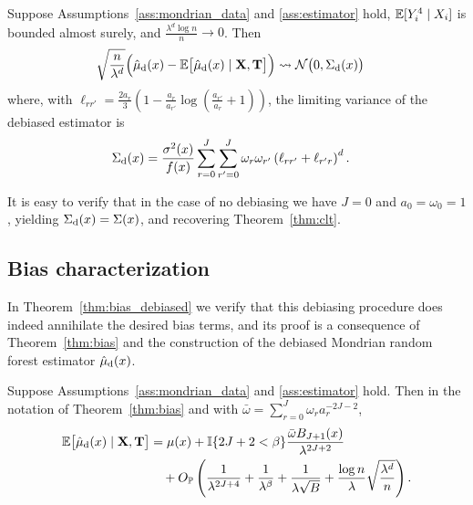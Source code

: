 \begin{theorem}%
  \label{thm:clt_debiased}
  Suppose Assumptions~\ref{ass:mondrian_data} and \ref{ass:estimator} hold,
  $\mathbb{E}[Y_i^4 \mid X_i ]$ is bounded almost surely,
  and $\frac{\lambda^d \log n}{n} \to 0$. Then
  \begin{align*}
    \sqrt{\frac{n}{\lambda^d}}
    \Big(
      \hat \mu_{\mathrm{d}}(x)
      - \mathbb{E} \big[ \hat \mu_{\mathrm{d}}(x) \mid \mathbf{X}, \mathbf{T} \big]
    \Big)
    &\rightsquigarrow
    \mathcal{N}\big(0, \Sigma_{\mathrm{d}}(x)\big)
  \end{align*}
  where, with
  $\ell_{r r'} = \frac{2 a_r}{3} \left( 1 - \frac{a_{r}}{a_{r'}}
  \log\left(\frac{a_{r'}}{a_{r}} + 1\right) \right)$,
  the limiting variance of the debiased estimator is
  \begin{align*}
    \Sigma_{\mathrm{d}}(x)
    &=
    \frac{\sigma^2(x)}{f(x)}
    \sum_{r=0}^{J}
    \sum_{r'=0}^{J}
    \omega_r
    \omega_{r'}
    \left( \ell_{r r'} + \ell_{r' r} \right)^d.
  \end{align*}
\end{theorem}

It is easy to verify that in the case of no debiasing we have
$J=0$ and $a_0 = \omega_0 = 1$, yielding
$\Sigma_{\mathrm{d}}(x) = \Sigma(x)$, and recovering Theorem~\ref{thm:clt}.

\subsection*{Bias characterization}

In Theorem~\ref{thm:bias_debiased}
we verify that this debiasing procedure does indeed annihilate the desired
bias terms, and its proof is a consequence
of Theorem~\ref{thm:bias} and
the construction of the debiased Mondrian random forest estimator
$\hat\mu_{\mathrm{d}}(x)$.

\begin{theorem}%
  \label{thm:bias_debiased}
  Suppose Assumptions~\ref{ass:mondrian_data} and \ref{ass:estimator} hold.
  Then in the notation of Theorem~\ref{thm:bias} and with
  $\bar\omega = \sum_{r=0}^J \omega_r a_r^{-2J - 2}$,
  \begin{align*}
    \mathbb{E} \big[ \hat \mu_{\mathrm{d}}(x) \mid \mathbf{X}, \mathbf{T} \big]
    &=
    \mu(x)
    + \mathbb{I}\{2J+2 < \beta \}
    \frac{\bar\omega B_{J+1}(x)}{\lambda^{2J + 2}} \\
    &\quad+
    O_{\mathbb{P}} \left(
      \frac{1}{\lambda^{2J + 4}}
      + \frac{1}{\lambda^\beta}
      + \frac{1}{\lambda \sqrt B}
      + \frac{\log n}{\lambda} \sqrt{\frac{\lambda^d}{n}}
    \right).
  \end{align*}
\end{theorem}

